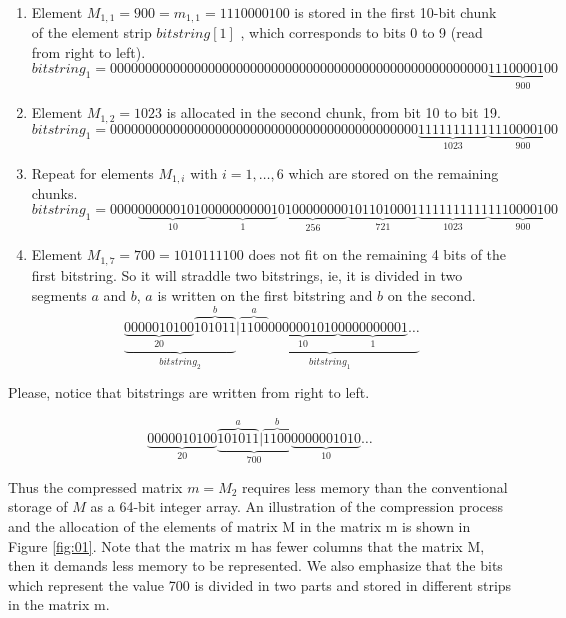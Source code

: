 \documentclass[10pt]{article}
\begin{document}
\begin{enumerate}
 \item Element $M_{1,1}=900 = m_{1,1} = 1110000100$ is stored in the first 10-bit chunk of the element strip $bitstring[1]$ , which corresponds to bits 0 to 9 (read from right to left).
\begin{equation*}\label{eq:04}
bitstring_1 = 000000000000000000000000000000000000000000000000000000\underbrace{1110000100}_{900} 
\end{equation*}
 \item Element $M_{1,2}=1023$ is allocated in the second chunk, from bit 10 to bit 19.
\begin{equation*}\label{eq:05}
 bitstring_1 = 00000000000000000000000000000000000000000000\underbrace{1111111111}_{1023}\underbrace{1110000100}_{900} 
\end{equation*}
 \item Repeat for elements $M_{1,i}$ with $i=1,\ldots,6$ which are stored on the remaining chunks.
 \begin{equation*}\label{eq:06}
bitstring_1 = 0000\underbrace{0000001010}_{10}\underbrace{0000000001}_{1}\underbrace{0100000000}_{256}\underbrace{1011010001}_{721}\underbrace{1111111111}_{1023}\underbrace{1110000100}_{900} 
 \end{equation*}
 \item Element $M_{1,7}=700=1010111100$ does not fit on the remaining 4 bits of 
the first bitstring. So it will straddle two bitstrings, ie, it is divided in 
two segments $a$ and $b$, $a$ is written on the first bitstring and $b$ on the 
second.
 \begin{equation*}\label{eq:07}
  \underbrace{\underbrace{0000010100}_{20}\overbrace{101011}^{b}}_{bitstring_2}|\underbrace{\overbrace{1100}^{a}\underbrace{0000001010}_{10}\underbrace{0000000001}_{1}\hdots}_{bitstring_1}
\end{equation*}
\end{enumerate}

 Please, notice that bitstrings are written from right to left.

\begin{equation*}\label{eq:8}
  \underbrace{0000010100}_{20}\underbrace{\overbrace{101011}^a|\overbrace{1100}^{b}}_{700}\underbrace{0000001010}_{10}\ldots
\end{equation*}

Thus the compressed matrix $m = M_2$ requires less memory than the conventional 
storage of $M$ as a 64-bit integer array. An illustration of the compression 
process and the allocation of the elements of matrix M in the matrix m is shown 
in Figure \ref{fig:01}. Note that the matrix m has fewer columns that the 
matrix M, then it demands less memory to be represented. We also emphasize that 
the bits which represent the value 700 is divided in two parts and stored in 
different strips in the matrix m.
\end{document}
